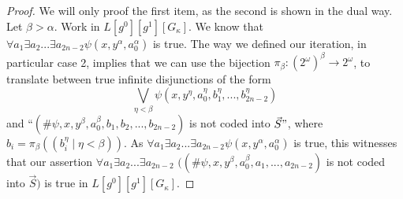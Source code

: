 \documentclass[a4paper,11pt]{article}
\begin{document}
\begin{proof}
We will only proof the first item, as the second is shown in the dual way. Let $\beta > \alpha$.
Work in $L[g^0][g^1][G_{\kappa}]$. We know that $\forall a_1 \exists a_2 ... \exists a_{2n-2} \psi (x,y^{\alpha},a_0^{\alpha})$ is true. The way we defined our iteration, in particular case 2, implies that we can use the bijection $\pi_{\beta} : (2^{\omega})^{\beta} \rightarrow 2^{\omega}$, to translate between true infinite disjunctions of the form
\[ \bigvee_{\eta <\beta} \psi (x,y^{\eta}, a^{\eta}_0,b^{\eta}_1,...,b^{\eta}_{2n-2} ) \] and 
``$(\# \psi,x,y^{\beta},a_0^{\beta}, b_1,b_2,...,b_{2n-2} )$ is not coded into $\vec{S}"$, where
$b_i= \pi_{\beta} ((b^{\eta}_i \mid \eta < \beta))$. As $\forall a_1 \exists a_2 ... \exists a_{2n-2} \psi (x,y^{\alpha},a_0^{\alpha})$ is true, this witnesses that our assertion
$\forall a_1 \exists a_2... \exists a_{2n-2}$ $((\#\psi, x,y^{\beta},a^{\beta}_0,a_1,...,a_{2n-2}) $ is not coded into $\vec{S})$ is true in $L[g^0][g^1][G_{\kappa}]$.


\end{proof}
\end{document}
